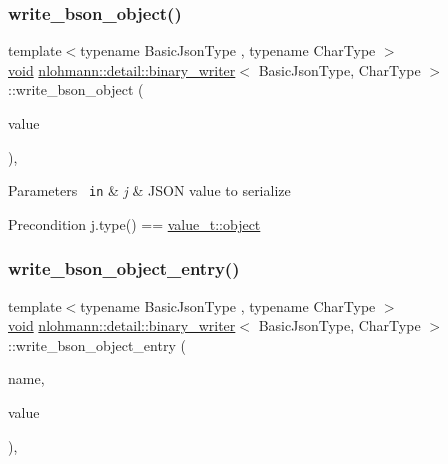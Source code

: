 \subsubsection{\texorpdfstring{write\_bson\_object()}{write\_bson\_object()}}
{\footnotesize\ttfamily template$<$typename Basic\+Json\+Type , typename Char\+Type $>$ \\
\mbox{\hyperlink{namespacenlohmann_1_1detail_a59fca69799f6b9e366710cb9043aa77d}{void}} \mbox{\hyperlink{classnlohmann_1_1detail_1_1binary__writer}{nlohmann\+::detail\+::binary\+\_\+writer}}$<$ Basic\+Json\+Type, Char\+Type $>$\+::write\+\_\+bson\+\_\+object (\begin{DoxyParamCaption}\item[{const typename Basic\+Json\+Type\+::object\+\_\+t \&}]{value }\end{DoxyParamCaption})\hspace{0.3cm}{\ttfamily [inline]}, {\ttfamily [private]}}


\begin{DoxyParams}[1]{Parameters}
\mbox{\texttt{ in}}  & {\em j} & J\+S\+ON value to serialize \\
\hline
\end{DoxyParams}
\begin{DoxyPrecond}{Precondition}
j.\+type() == \mbox{\hyperlink{namespacenlohmann_1_1detail_a1ed8fc6239da25abcaf681d30ace4985aa8cfde6331bd59eb2ac96f8911c4b666}{value\+\_\+t\+::object}} 
\end{DoxyPrecond}
\mbox{\label{classnlohmann_1_1detail_1_1binary__writer_a6231302930265eccb3f56c378f7b0661}} 
\subsubsection{\texorpdfstring{write\_bson\_object\_entry()}{write\_bson\_object\_entry()}}
{\footnotesize\ttfamily template$<$typename Basic\+Json\+Type , typename Char\+Type $>$ \\
\mbox{\hyperlink{namespacenlohmann_1_1detail_a59fca69799f6b9e366710cb9043aa77d}{void}} \mbox{\hyperlink{classnlohmann_1_1detail_1_1binary__writer}{nlohmann\+::detail\+::binary\+\_\+writer}}$<$ Basic\+Json\+Type, Char\+Type $>$\+::write\+\_\+bson\+\_\+object\+\_\+entry (\begin{DoxyParamCaption}\item[{const \mbox{\hyperlink{classnlohmann_1_1detail_1_1binary__writer_a29f2ae7a5c4a8c1dae47b3b2310de8a8}{string\+\_\+t}} \&}]{name,  }\item[{const typename Basic\+Json\+Type\+::object\+\_\+t \&}]{value }\end{DoxyParamCaption})\hspace{0.3cm}{\ttfamily [inline]}, {\ttfamily [private]}}



